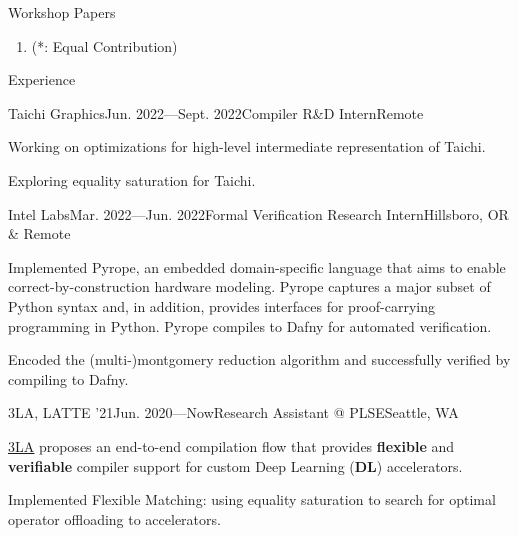 \documentclass{resume}
\newcommand{\myul}[2][blue]{\setulcolor{#1}\ul{#2}\setulcolor{blue}}
\begin{document}
	\vspace{1pt}
	\begin{rSection}{Workshop Papers}
		\begin{enumerate}
			\setlength{\itemsep}{1pt}
            \setlength{\parskip}{0pt}
			\setlength{\parsep}{0pt}
			\item {} (\small{*: Equal Contribution})
		\end{enumerate}
        \vspace{-5pt}
	\end{rSection}
    \vspace{1pt}

    \begin{rSection}{Experience}
		\begin{rSubsection}{Taichi Graphics}{Jun. 2022---Sept. 2022}{Compiler R\&D Intern}{Remote}
			\item Working on optimizations for high-level intermediate representation of Taichi.
			\item Exploring equality saturation for Taichi.
		\end{rSubsection}
		\begin{rSubsection}{Intel Labs}{Mar. 2022---Jun. 2022}{Formal Verification Research Intern}{Hillsboro, OR \& Remote}
			\item Implemented Pyrope, an embedded domain-specific language that aims to enable correct-by-construction hardware modeling. Pyrope captures a major subset of Python syntax and, in addition, provides interfaces for proof-carrying programming in Python. Pyrope compiles to Dafny for automated verification.
            \item Encoded the (multi-)montgomery reduction algorithm and successfully verified by compiling to Dafny.
		\end{rSubsection}
		\vspace{-5pt}
        \begin{rSubsection}{3LA, LATTE '21}{Jun. 2020---Now}{Research Assistant @ PLSE}{Seattle, WA}
            \item \href{https://capra.cs.cornell.edu/latte21/paper/30.pdf}{\color{blue} \myul{3LA}} proposes an end-to-end compilation flow that provides \textbf{flexible} and \textbf{verifiable} compiler support for custom Deep Learning (\textbf{DL}) accelerators.
            \item Implemented Flexible Matching: using equality saturation to search for optimal operator offloading to accelerators.
        \end{rSubsection}

\end{rSection}
\end{document}
